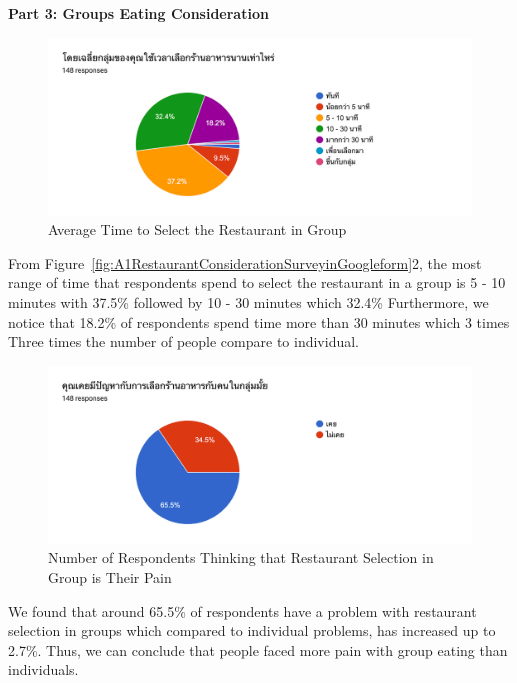 \documentclass[12pt,oneside,openright,a4paper]{cpe-english-project}
\begin{document}
\newpage
\textbf{Part 3: Groups Eating Consideration}

\begin{figure}[H]\centering
\includegraphics[width=350pt]{./images/A1AverageTimetoSelecttheRestaurantinGroup.png}
\caption{Average Time to Select the Restaurant in Group}\label{fig:A1AverageTimetoSelecttheRestaurantinGroup}
\end{figure}

From Figure~\ref{fig:A1RestaurantConsiderationSurveyinGoogleform}2, the most range of time that respondents spend to select the restaurant in a group is 5 - 10 minutes with 37.5\% followed by 10 - 30 minutes which 32.4\% Furthermore, we notice that 18.2\% of respondents spend time more than 30 minutes which 3 times Three times the number of people compare to individual.

\begin{figure}[H]\centering
\includegraphics[width=350pt]{./images/A1NumberofRespondentsThinkingthatRestaurantSelectioninGroupisTheirPain.png}
\caption{Number of Respondents Thinking that Restaurant Selection in Group is Their Pain}\label{fig:A1NumberofRespondentsThinkingthatRestaurantSelectioninGroupisTheirPain}
\end{figure}

We found that around 65.5\% of respondents have a problem with restaurant selection in groups which compared to individual problems, has increased up to 2.7\%. Thus, we can conclude that people faced more pain with group eating than individuals.
\end{document}
